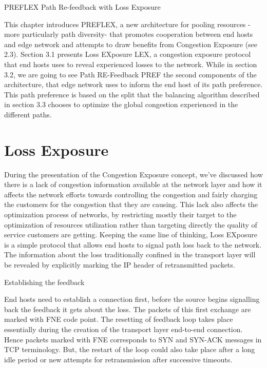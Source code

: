 PREFLEX Path Re-feedback with Loss Exposure

This chapter introduces PREFLEX, a new architecture for pooling resources -more particularly path diversity- that promotes cooperation between end hosts and edge network and attempts to draw benefits from Congestion Exposure (see 2.3). Section 3.1 presents Loss EXposure LEX, a congestion exposure protocol that end hosts uses to reveal experienced losses to the network. While in section 3.2, we are going to see Path RE-Feedback PREF the second components of the architecture, that edge network uses to inform the end host of its path preference. This path preference is based on  the split that the balancing algorithm described in section 3.3 chooses to optimize the global congestion experienced in the different paths.

\section{Loss Exposure}

During the presentation of the Congestion Exposure concept, we've discussed how there is a lack of congestion information available at the network layer and how it affects the network efforts towards controlling the congestion and fairly charging the customers for the congestion that they are causing. This lack also affects the optimization process of networks, by restricting mostly their target to the optimization of resources utilization rather than targeting directly the quality of service customers are getting. Keeping the same line of thinking, Loss EXposure is a simple protocol that allows end hosts to signal path loss back to the network. The information about the loss traditionally confined in the transport layer will be revealed by explicitly marking the IP header of retransmitted  packets.

Establishing the feedback

End hosts need to establish a connection first, before the source begins signalling back the feedback it gets about the loss. The packets of this first exchange are marked with FNE code point. The resetting of  feedback loop takes place essentially during the creation of the transport layer end-to-end connection.  Hence packets marked with FNE corresponds to SYN and SYN-ACK messages in TCP terminology. But, the restart of the loop could also take place after a long idle period or new attempts for retransmission after successive timeouts.

